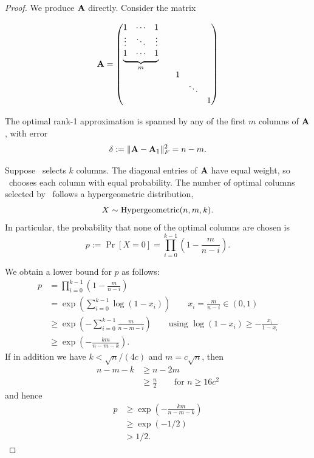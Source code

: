 \begin{proof}
    We produce $\mathbf{A}$ directly. Consider the matrix

    \begin{equation} 
    \label{eq:rpcholesky-worst-case}
    \mathbf{A} = 
    \begin{pmatrix}
        \underbrace{\begin{matrix}
        1 & \cdots & 1 \\
        \vdots& \ddots &\vdots\\
        1 & \cdots & 1 \\
        \end{matrix}}_{\text{$m$}}\\
        && 1 & \\
        && & \ddots \\
        && & & 1 \\
    \end{pmatrix}
    \end{equation}

    The optimal rank-1 approximation is spanned by any of the first $m$ columns of $\mathbf{A}$, with error 
    \[\delta := \|\mathbf{A} - \mathbf{A}_1\|^2_F = n-m.\]
    
   Suppose \RPCholesky\ selects $k$ columns. The diagonal entries of $\mathbf{A}$ have equal weight, so \RPCholesky\ chooses each column with equal probability. The number of optimal columns selected by \RPCholesky\ follows a hypergeometric distribution, 
   \[X\sim\operatorname*{Hypergeometric}(n,m,k).\]
   In particular, the probability that none of the optimal columns are chosen is
   \[
       p := \Pr[X = 0] = \prod_{i=0}^{k-1}\left(1-\frac{m}{n-i}\right).
   \]

   We obtain a lower bound for $p$ as follows:
    \begin{align*}
        p &= \prod_{i=0}^{k-1}\left(1-\frac{m}{n-i}\right)\\
        &= \exp\left(\sum_{i=0}^{k-1}\log\left(1-x_i\right)\right)\qquad x_i=\frac{m}{n-i} \in (0, 1)\\
        &\geq \exp\left(-\sum_{i=0}^{k-1}\frac{m}{n-m-i}\right)\qquad\text{using $\log(1-x_i)\geq -\frac{x_i}{1-x_i}$}\\
        &\geq \exp\left(-\frac{km}{n-m-k}\right).
    \end{align*}
    If in addition we have $k < \sqrt{n}/(4c)$ and $m = c\sqrt{n}$, then 
    \begin{align*}
        n-m-k&\geq n-2m\\
        &\geq \frac{n}{2}\qquad\text{for $n\geq 16c^2$}
    \end{align*}
    and hence
    \begin{align*}
        p &\geq \exp\left(-\frac{km}{n-m-k}\right)\\
        &\geq \exp\left(-1/2\right)\\
        & > 1/2.
    \end{align*}
    

\end{proof}
